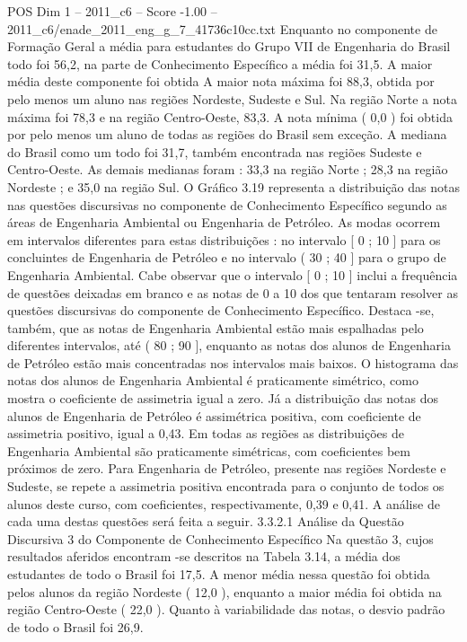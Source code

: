 \begin{textsample}{POS Dim 1 – 2011\_c6 – Score -1.00 – 2011\_c6/enade\_2011\_eng\_g\_7\_41736c10cc.txt}
Enquanto no componente de Formação Geral a média para estudantes do Grupo VII de Engenharia do Brasil todo foi 56,2, na parte de Conhecimento Específico a média foi 31,5.
A maior média deste componente foi obtida A maior nota máxima foi 88,3, obtida por pelo menos um aluno nas regiões Nordeste, Sudeste e Sul.
Na região Norte a nota máxima foi 78,3 e na região Centro-Oeste, 83,3.
A nota mínima ( 0,0 ) foi obtida por pelo menos um aluno de todas as regiões do Brasil sem exceção.
A mediana do Brasil como um todo foi 31,7, também encontrada nas regiões Sudeste e Centro-Oeste.
As demais medianas foram : 33,3 na região Norte ; 28,3 na região Nordeste ; e 35,0 na região Sul.
O Gráfico 3.19 representa a distribuição das notas nas questões discursivas no componente de Conhecimento Específico segundo as áreas de Engenharia Ambiental ou Engenharia de Petróleo.
As modas ocorrem em intervalos diferentes para estas distribuições : no intervalo [ 0 ; 10 ] para os concluintes de Engenharia de Petróleo e no intervalo ( 30 ; 40 ] para o grupo de Engenharia Ambiental.
Cabe observar que o intervalo [ 0 ; 10 ] inclui a frequência de questões deixadas em branco e as notas de 0 a 10 dos que tentaram resolver as questões discursivas do componente de Conhecimento Específico.
Destaca -se, também, que as notas de Engenharia Ambiental estão mais espalhadas pelo diferentes intervalos, até ( 80 ; 90 ], enquanto as notas dos alunos de Engenharia de Petróleo estão mais concentradas nos intervalos mais baixos.
O histograma das notas dos alunos de Engenharia Ambiental é praticamente simétrico, como mostra o coeficiente de assimetria igual a zero.
Já a distribuição das notas dos alunos de Engenharia de Petróleo é assimétrica positiva, com coeficiente de assimetria positivo, igual a 0,43.
Em todas as regiões as distribuições de Engenharia Ambiental são praticamente simétricas, com coeficientes bem próximos de zero.
Para Engenharia de Petróleo, presente nas regiões Nordeste e Sudeste, se repete a assimetria positiva encontrada para o conjunto de todos os alunos deste curso, com coeficientes, respectivamente, 0,39 e 0,41.
A análise de cada uma destas questões será feita a seguir. 3.3.2.1 Análise da Questão Discursiva 3 do Componente de Conhecimento Específico Na questão 3, cujos resultados aferidos encontram -se descritos na Tabela 3.14, a média dos estudantes de todo o Brasil foi 17,5.
A menor média nessa questão foi obtida pelos alunos da região Nordeste ( 12,0 ), enquanto a maior média foi obtida na região Centro-Oeste ( 22,0 ).
Quanto à variabilidade das notas, o desvio padrão de todo o Brasil foi 26,9.

\end{textsample}
